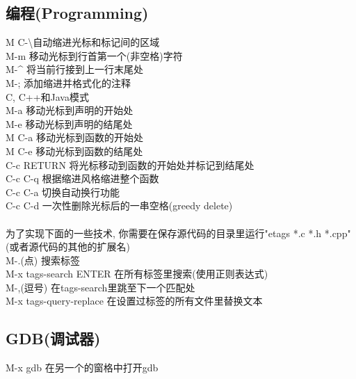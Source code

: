 \documentclass[11pt,a4paper,titlepage]{article}
\begin{document}
{\subsection{\kai 编程(Programming)}
M C-\textbackslash 自动缩进光标和标记间的区域\\
M-m 移动光标到行首第一个(非空格)字符\\
M-\^{} 将当前行接到上一行末尾处\\
M-; 添加缩进并格式化的注释\\
C, C++和Java模式\\
M-a 移动光标到声明的开始处\\
M-e 移动光标到声明的结尾处\\
M C-a 移动光标到函数的开始处\\
M C-e 移动光标到函数的结尾处\\
C-c RETURN 将光标移动到函数的开始处并标记到结尾处\\
C-c C-q 根据缩进风格缩进整个函数\\
C-c C-a 切换自动换行功能\\
C-c C-d 一次性删除光标后的一串空格(greedy delete)\\
  \\
为了实现下面的一些技术, 你需要在保存源代码的目录里运行"etags *.c *.h *.cpp"(或者源代码的其他的扩展名)\\
M-.(点) 搜索标签\\
M-x tags-search ENTER 在所有标签里搜索(使用正则表达式)\\
M-,(逗号) 在tags-search里跳至下一个匹配处\\
M-x tags-query-replace 在设置过标签的所有文件里替换文本\\

\subsection{\kai GDB(调试器)}
M-x gdb 在另一个的窗格中打开gdb\\

}
\end{document}
